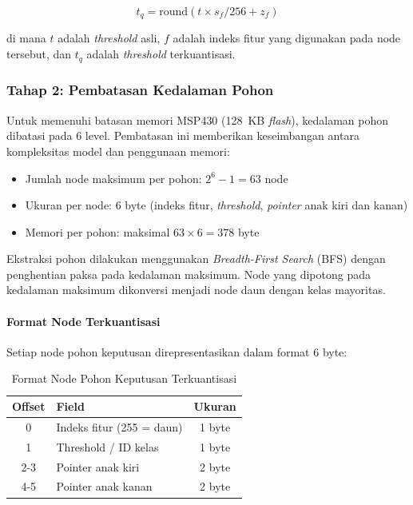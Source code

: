 \begin{equation}
    t_q = \text{round}(t \times s_{f} / 256 + z_{f})
\end{equation}

di mana $t$ adalah \textit{threshold} asli, $f$ adalah indeks fitur yang digunakan pada node tersebut, dan $t_q$ adalah \textit{threshold} terkuantisasi.

\subsubsection{Tahap 2: Pembatasan Kedalaman Pohon}

Untuk memenuhi batasan memori MSP430 (128~KB \textit{flash}), kedalaman pohon dibatasi pada 6 level. Pembatasan ini memberikan keseimbangan antara kompleksitas model dan penggunaan memori:

\begin{itemize}
    \item Jumlah node maksimum per pohon: $2^6 - 1 = 63$ node
    \item Ukuran per node: 6 byte (indeks fitur, \textit{threshold}, \textit{pointer} anak kiri dan kanan)
    \item Memori per pohon: maksimal $63 \times 6 = 378$ byte
\end{itemize}

Ekstraksi pohon dilakukan menggunakan \textit{Breadth-First Search} (BFS) dengan penghentian paksa pada kedalaman maksimum. Node yang dipotong pada kedalaman maksimum dikonversi menjadi node daun dengan kelas mayoritas.

\paragraph{Format Node Terkuantisasi}
Setiap node pohon keputusan direpresentasikan dalam format 6 byte:

\begin{table}[htbp]
\centering
\caption{Format Node Pohon Keputusan Terkuantisasi}
\label{tab:node_format}
\begin{tabular}{clc}
\hline
\textbf{Offset} & \textbf{Field} & \textbf{Ukuran} \\
\hline
0 & Indeks fitur (255 = daun) & 1 byte \\
1 & Threshold / ID kelas & 1 byte \\
2-3 & Pointer anak kiri & 2 byte \\
4-5 & Pointer anak kanan & 2 byte \\
\hline
\end{tabular}
\end{table}

